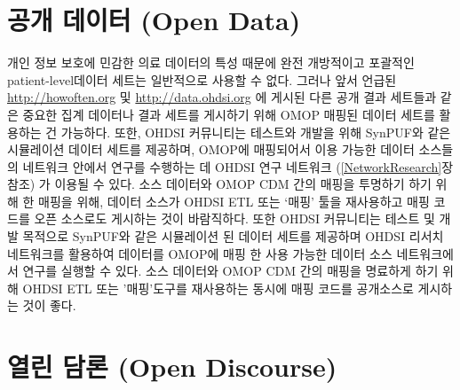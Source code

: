 \documentclass[11pt]{book}
\theoremstyle{definition}
\theoremstyle{definition}
\theoremstyle{definition}
\theoremstyle{remark}
\begin{document}
\section{공개 데이터 (Open Data)}\label{--open-data}


개인 정보 보호에 민감한 의료 데이터의 특성 때문에 완전 개방적이고
포괄적인 patient-level데이터 세트는 일반적으로 사용할 수 없다. 그러나
앞서 언급된 \url{http://howoften.org} 및 \url{http://data.ohdsi.org} 에
게시된 다른 공개 결과 세트들과 같은 중요한 집계 데이터나 결과 세트를
게시하기 위해 OMOP 매핑된 데이터 세트를 활용하는 건 가능하다. 또한,
OHDSI 커뮤니티는 테스트와 개발을 위해 SynPUF와 같은 시뮬레이션 데이터
세트를 제공하며, OMOP에 매핑되어서 이용 가능한 데이터 소스들의 네트워크
안에서 연구를 수행하는 데 OHDSI 연구 네트워크 (\ref{NetworkResearch}장
참조) 가 이용될 수 있다. 소스 데이터와 OMOP CDM 간의 매핑을 투명하기
하기 위해 한 매핑을 위해, 데이터 소스가 OHDSI ETL 또는 `매핑' 툴을
재사용하고 매핑 코드를 오픈 소스로도 게시하는 것이 바람직하다. 또한
OHDSI 커뮤니티는 테스트 및 개발 목적으로 SynPUF와 같은 시뮬레이션 된
데이터 세트를 제공하며 OHDSI 리서치 네트워크를 활용하여 데이터를 OMOP에
매핑 한 사용 가능한 데이터 소스 네트워크에서 연구를 실행할 수 있다. 소스
데이터와 OMOP CDM 간의 매핑을 명료하게 하기 위해 OHDSI ETL 또는
'매핑'도구를 재사용하는 동시에 매핑 코드를 공개소스로 게시하는 것이
좋다.

\section{열린 담론 (Open Discourse)}\label{--open-discourse}

\end{document}
